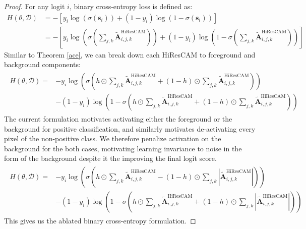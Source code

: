 \documentclass{article}
\theoremstyle{plain}
\theoremstyle{definition}
\theoremstyle{remark}
\begin{document}
\begin{proof} For any logit $i$, binary cross-entropy loss is defined as:
	\begin{align}
		H(\theta, \mathcal{D}) &= -\left[ y_i \log (\sigma(\bm{s}_i)) + (1 - y_i) \log (1 - \sigma(\bm{s}_i)) \right] \\
		&= -\left[ y_i \log \left(\sigma\left(\sum_{j,k}\tilde{\mathcal{\bm{A}}}_{i,j,k}^{\text{HiResCAM}}\right) \right) + (1 - y_i) \log \left(1 - \sigma\left(\sum_{j,k}\tilde{\mathcal{\bm{A}}}_{i,j,k}^{\text{HiResCAM}}\right) \right) \right]
	\end{align}
	Similar to Theorem \ref{ace}, we can break down each HiResCAM to foreground and background components:
	\begin{gather}
		\begin{split}
			H(\theta, \mathcal{D}) = &- y_i \log \left(\sigma\left(h \odot \sum_{j,k}\tilde{\mathcal{\bm{A}}}_{i,j,k}^{\text{HiResCAM}} + (1-h) \odot \sum_{j,k}\tilde{\mathcal{\bm{A}}}_{i,j,k}^{\text{HiResCAM}}\right) \right) \\
			&- (1 - y_i) \log \left(1 - \sigma\left(h \odot \sum_{j,k}\tilde{\mathcal{\bm{A}}}_{i,j,k}^{\text{HiResCAM}} + (1-h) \odot \sum_{j,k}\tilde{\mathcal{\bm{A}}}_{i,j,k}^{\text{HiResCAM}}\right) \right)
		\end{split}
	\end{gather}
	The current formulation motivates activating either the foreground or the background for positive classification, and similarly motivates de-activating every pixel of the non-positive class. We therefore penalize activation on the background for the both cases, motivating learning invariance to noise in the form of the background despite it the improving the final logit score.
	\begin{gather}
		\begin{split}
			H(\theta, \mathcal{D}) = &- y_i \log \left(\sigma\left(h \odot \sum_{j,k}\tilde{\mathcal{\bm{A}}}_{i,j,k}^{\text{HiResCAM}} - (1-h) \odot \sum_{j,k}|\tilde{\mathcal{\bm{A}}}_{i,j,k}^{\text{HiResCAM}}|\right) \right) \\
			&- (1 - y_i) \log \left(1 - \sigma\left(h \odot \sum_{j,k}\tilde{\mathcal{\bm{A}}}_{i,j,k}^{\text{HiResCAM}} + (1-h) \odot \sum_{j,k}|\tilde{\mathcal{\bm{A}}}_{i,j,k}^{\text{HiResCAM}}|\right) \right)
		\end{split}
	\end{gather}
	This gives us the ablated binary cross-entropy formulation.
\end{proof}
\end{document}
